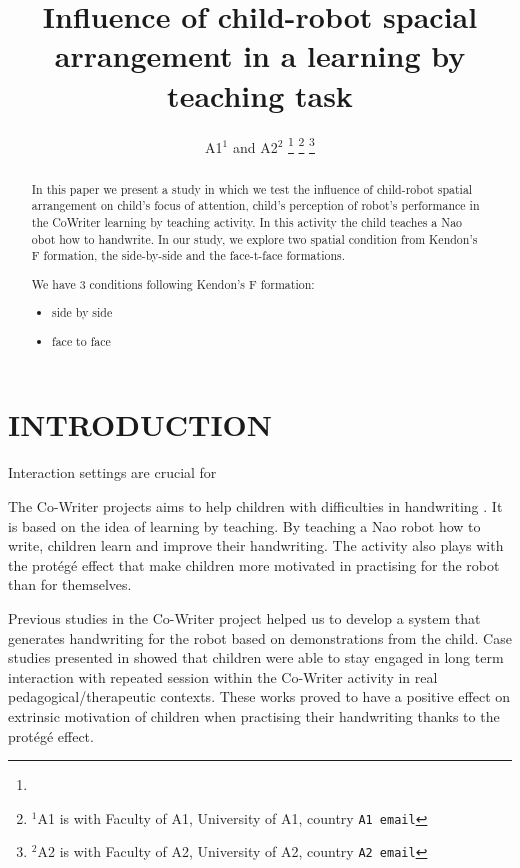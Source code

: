 \documentclass[letterpaper, 10 pt, conference]{ieeeconf}  %
\title{\LARGE \bf
Influence of child-robot spacial arrangement in a learning by teaching task}
\author{A1$^{1}$ and A2$^{2}$%
\thanks{}%
\thanks{$^{1}$A1 is with Faculty of A1,
        University of A1, country
        {\tt\small A1 email}}%
\thanks{$^{2}$A2 is with Faculty of A2,
        University of A2, country
        {\tt\small A2 email}}%
}
\begin{document}
\maketitle
\thispagestyle{empty}
\pagestyle{empty}


\begin{abstract}
In this paper we present a study in which we test the influence of child-robot spatial arrangement on child's focus of attention, child's perception of robot's performance in the CoWriter learning by teaching activity.
In this activity the child teaches a Nao obot how to handwrite. 
In our study, we explore two spatial condition from Kendon's F formation, the side-by-side and the face-t-face formations. 

We have 3 conditions following Kendon's F formation: 
\begin{itemize}
\item side by side
\item face to face
\end{itemize}



\end{abstract}


\section{INTRODUCTION}
Interaction settings are crucial for 

The Co-Writer projects aims to help children with difficulties in handwriting \cite{hood2015when}. 
It is based on the idea of learning by teaching. 
By teaching a Nao robot how to write, children learn and improve their handwriting. 
The activity also plays with the protégé effect that make children more motivated in practising for the robot than for themselves. 

Previous studies in the Co-Writer project helped us to develop a system that generates handwriting for the robot based on demonstrations from the child\cite{hood2015when}. 
Case studies presented in \cite{jacq2016building} showed that children were able to stay engaged in long term interaction with repeated session within the Co-Writer activity in real pedagogical/therapeutic contexts. 
These works proved to have a positive effect on extrinsic motivation of children when practising their handwriting thanks to the protégé effect. 
\end{document}
